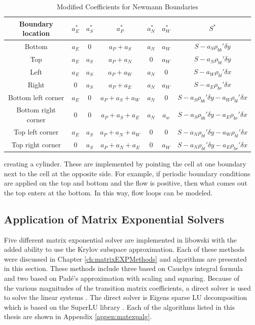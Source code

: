\begin{table}[p]
    \caption{\label{tab:newmannBoundaries} Modified Coefficients for Newmann Boundaries}
    \centering
    \begin{tabular}{c|c|c|c|c|c|c}
    \hline
    \textbf{Boundary location} & \textbf{$a_{E}^{*}$} & \textbf{$a_{S}^{*}$} & \textbf{$a_{P}^{*}$} & \textbf{$a_{N}^{*}$} & \textbf{$a_{W}^{*}$} & \textbf{$S^{*}$} \\ [0.5ex]
    \hline
    \hline
    Bottom & $a_{E}$ & $0$ & $a_{P} + a_{S}$ & $a_{N}$ & $a_{W}$ & $S - a_{S}\rho_{bb}'\delta y$\\ \hline
    Top & $a_{E}$ & $a_{S}$ & $a_{P} + a_{N}$ & $0$ & $a_{W}$ & $S - a_{N}\rho_{bt}'\delta y$ \\ \hline 
    Left & $a_{E}$ & $a_{S}$ & $a_{P} + a_{W}$ & $a_{N}$ & $0$ & $S - a_{W}\rho_{bl}'\delta x$  \\ \hline
    Right & $0$ & $a_{S}$ & $a_{P} + a_{E}$ & $a_{N}$ & $a_{W}$ & $S - a_{E}\rho_{br}'\delta x$  \\ \hline
    Bottom left corner & $a_{E}$ & $0$ & $a_{P} + a_{S} + a_{W}$ & $a_{N}$ & $0$ & $S - a_{S}\rho_{bb}'\delta y - a_{W}\rho_{bl}'\delta x$ \\ \hline
    Bottom right corner & $0$ & $0$ & $a_{P} + a_{S} + a_{E}$ & $a_{N}$ & $a_{w}$ & $S - a_{S}\rho_{bb}'\delta y - a_{E}\rho_{br}'\delta x$ \\ \hline
    Top left corner & $a_{E}$ & $a_{S}$ & $a_{P} + a_{N} + a_{W}$ & $0$ & $0$ & $S - a_{N}\rho_{bt}'\delta y - a_{W}\rho_{bl}'\delta x$ \\ \hline
    Top right corner & $0$ & $a_{S}$ & $a_{P} + a_{N} + a_{E}$ & $0$ & $a_{W}$ & $S - a_{N}\rho_{bt}'\delta y - a_{E}\rho_{br}'\delta x$ \\ \hline
    \end{tabular}
\end{table}

\clearpage

\noindent creating a cylinder. These are implemented by pointing the cell at one boundary next to the cell at the opposite side. For example, if periodic boundary conditions are applied on the top and bottom and the flow is positive, then what comes out the top enters at the bottom. In this way, flow loops can be modeled.


\subsection{Application of Matrix Exponential Solvers}
Five different matrix exponential solver are implemented in libowski with the added ability to use the Krylov subspace approximation. Each of these methods were discussed in Chapter \ref{ch:matrixEXPMethods} and algorithms are presented in this section. These methods include three based on Cauchys integral formula and two based on Pad\'e's approximation with scaling and squaring. Because of the  various magnitudes of the transition matrix coefficients, a direct solver is used to solve the linear systems \cite{pusa2013}. The direct solver is Eigens sparse LU decomposition which is based on the SuperLU library \cite{eigen} \cite{superlu99}. Each of the algorithms listed in this thesis are shown in Appendix \ref{appen:matexpalg}.

